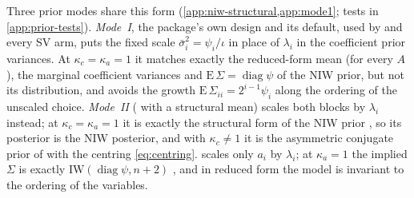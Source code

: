 Three prior modes share this form (\cref{app:niw-structural,app:mode1}; tests in
\cref{app:prior-tests}). \emph{Mode~I}, the package's own design and its default, used by
 and every SV arm, puts the fixed scale $\bar\sigma_i^2 = \psi_i/\iota$ in place of $\lambda_i$ in the coefficient
prior variances. %
At $\kappa_c = \kappa_a = 1$ it matches exactly the reduced-form mean (for every $A$), the marginal
coefficient variances and $\mathrm{E}\,\Sigma = \operatorname{diag}\psi$ of the NIW prior, but not
its distribution, and avoids the growth $\mathrm{E}\,\Sigma_{ii} = 2^{i-1}\psi_i$ along the ordering
\citep{chan2024large} of the unscaled choice. %
\emph{Mode~II} ( with a structural mean) scales both blocks by $\lambda_i$
instead; at $\kappa_c = \kappa_a = 1$ it is exactly the structural form of the NIW prior \citep[Corollary~1]{chan2022asymmetric}, so its posterior is the
NIW posterior, %
and with $\kappa_c \neq 1$ it is the asymmetric conjugate prior of \citet{chan2022asymmetric} with
the centring \eqref{eq:centring}. %
 scales only $a_i$ by $\lambda_i$; at $\kappa_a = 1$ the implied
$\Sigma$ is exactly $\mathrm{IW}(\operatorname{diag}\psi, n+2)$
\citep[Proposition~1]{chan2022asymmetric}, and in reduced form the model is invariant to the
ordering of the variables. %

